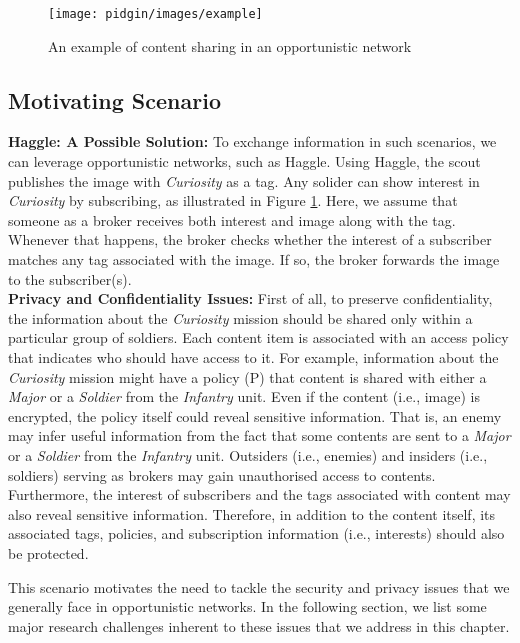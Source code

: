 \documentclass[epsfig,a4paper,11pt,titlepage]{book}
\numberwithin{algorithm}{chapter}
\begin{document}
\begin{figure} [htp]
\centering
\texttt{[image: pidgin/images/example]}
\caption{An example of content sharing in an opportunistic network}
\label{fig:pidgin-example}
\end{figure}

\subsection{Motivating Scenario}
\label{sec:pidgin-scenario}

\noindent \textbf{Haggle: A Possible Solution:} To exchange information in such scenarios, we can leverage opportunistic networks, such as Haggle. Using Haggle, the scout publishes the image with \emph{Curiosity} as a tag. Any solider can show interest in \emph{Curiosity} by subscribing, as illustrated in Figure \ref{fig:pidgin-example}. Here, we assume that someone as a broker receives both interest and image along with the tag. Whenever that happens, the broker checks whether the interest of a subscriber matches any tag associated with the image. If so, the broker forwards the image to the subscriber(s). \\

\noindent \textbf{Privacy and Confidentiality Issues:} First of all, to preserve confidentiality, the information about the \emph{Curiosity} mission should be shared only within a particular group of soldiers. Each content item is associated with an access policy that indicates who should have access to it. For example, information about the \emph{Curiosity} mission might have a policy (P) that content is shared with either a \emph{Major} or a \emph{Soldier} from the \emph{Infantry} unit. Even if the content (i.e., image) is encrypted, the policy itself could reveal sensitive information. That is, an enemy may infer useful information from the fact that some contents are sent to a \emph{Major} or a \emph{Soldier} from the \emph{Infantry} unit. Outsiders (i.e., enemies) and insiders (i.e., soldiers) serving as brokers may gain unauthorised access to contents. Furthermore, the interest of subscribers and the tags associated with content may also reveal sensitive information. Therefore, in addition to the content itself, its associated tags, policies, and subscription information (i.e., interests) should also be protected.

This scenario motivates the need to tackle the security and privacy issues that we generally face in opportunistic networks. In the following section, we list some major research challenges inherent to these issues that we address in this chapter.
\end{document}
